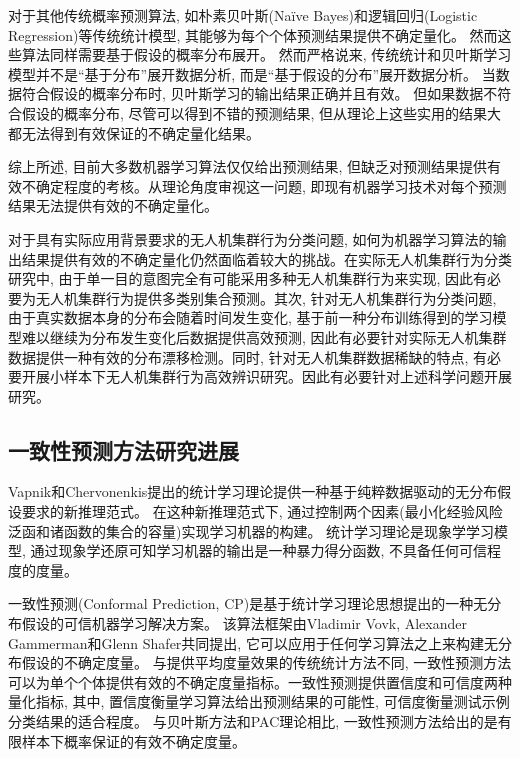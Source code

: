 对于其他传统概率预测算法, 如朴素贝叶斯(Na\"{i}ve Bayes)和逻辑回归(Logistic Regression)等传统统计模型, 其能够为每个个体预测结果提供不确定量化。 然而这些算法同样需要基于假设的概率分布展开。 然而严格说来, 传统统计和贝叶斯学习模型并不是“基于分布”展开数据分析, 而是“基于假设的分布”展开数据分析。 当数据符合假设的概率分布时, 贝叶斯学习的输出结果正确并且有效。 但如果数据不符合假设的概率分布, 尽管可以得到不错的预测结果, 但从理论上这些实用的结果大都无法得到有效保证的不确定量化结果\citep{vovk2005algorithmic}。

综上所述, 目前大多数机器学习算法仅仅给出预测结果, 但缺乏对预测结果提供有效不确定程度的考核。从理论角度审视这一问题, 即现有机器学习技术对每个预测结果无法提供有效的不确定量化\citep{2006Hedging}。

对于具有实际应用背景要求的无人机集群行为分类问题, 如何为机器学习算法的输出结果提供有效的不确定量化仍然面临着较大的挑战。在实际无人机集群行为分类研究中, 由于单一目的意图完全有可能采用多种无人机集群行为来实现, 因此有必要为无人机集群行为提供多类别集合预测。其次, 针对无人机集群行为分类问题, 由于真实数据本身的分布会随着时间发生变化, 基于前一种分布训练得到的学习模型难以继续为分布发生变化后数据提供高效预测, 因此有必要针对实际无人机集群数据提供一种有效的分布漂移检测\citep{Vovk2003,Vovk2012}。同时, 针对无人机集群数据稀缺的特点, 有必要开展小样本下无人机集群行为高效辨识研究\citep{Vapnik2009}。因此有必要针对上述科学问题开展研究。

\subsection{一致性预测方法研究进展}
Vapnik和Chervonenkis提出的统计学习理论提供一种基于纯粹数据驱动的无分布假设要求的新推理范式\citep{vapnik1974,vapnik1979,vapnik1982,vapnik1984,vapnik1995,vapnik1998,Vapnik2006,Chervonenkis2013}。 在这种新推理范式下, 通过控制两个因素(最小化经验风险泛函和诸函数的集合的容量)实现学习机器的构建。 统计学习理论是现象学学习模型\citep{Vapnik2019,Vapnik-context-2021,Vapnik-deep-2018,Vapnik-rethinking-2018}, 通过现象学还原\citep{vapnik2021-priviate-communication}可知学习机器的输出是一种暴力得分函数\citep{vapniktalk2015}, 不具备任何可信程度的度量\citep{2006Hedging}。 

一致性预测(Conformal Prediction, CP)是基于统计学习理论思想提出的一种无分布假设的可信机器学习解决方案\citep{vovk2005algorithmic}。 该算法框架由Vladimir Vovk, Alexander Gammerman和Glenn Shafer共同提出\citep{vovk2005algorithmic}, 它可以应用于任何学习算法之上来构建无分布假设的不确定度量。 与提供平均度量效果的传统统计方法不同, 一致性预测方法可以为单个个体提供有效的不确定度量指标。一致性预测提供置信度和可信度两种量化指标, 其中, 置信度衡量学习算法给出预测结果的可能性, 可信度衡量测试示例分类结果的适合程度。 与贝叶斯方法和PAC理论相比, 一致性预测方法给出的是有限样本下概率保证的有效不确定度量\citep{Poggi2017}。

